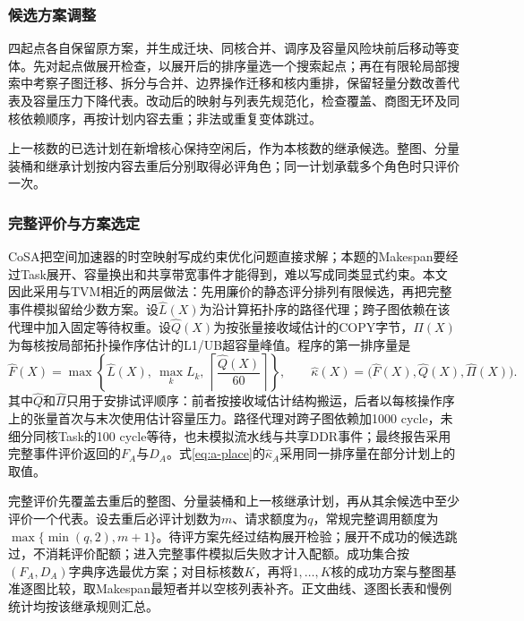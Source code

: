 \subsubsection{候选方案调整}
四起点各自保留原方案，并生成迁块、同核合并、调序及容量风险块前后移动等变体。先对起点做展开检查，以展开后的排序量选一个搜索起点；再在有限轮局部搜索中考察子图迁移、拆分与合并、边界操作迁移和核内重排，保留轻量分数改善代表及容量压力下降代表。改动后的映射与列表先规范化，检查覆盖、商图无环及同核依赖顺序，再按计划内容去重；非法或重复变体跳过。

上一核数的已选计划在新增核心保持空闲后，作为本核数的继承候选。整图、分量装桶和继承计划按内容去重后分别取得必评角色；同一计划承载多个角色时只评价一次。

\subsubsection{完整评价与方案选定}
CoSA把空间加速器的时空映射写成约束优化问题直接求解\cite{huang2021cosa}；本题的Makespan要经过Task展开、容量换出和共享带宽事件才能得到，难以写成同类显式约束。本文因此采用与TVM相近的两层做法\cite{chen2018tvm}：先用廉价的静态评分排列有限候选，再把完整事件模拟留给少数方案。设$\widehat L(X)$为沿计算拓扑序的路径代理；跨子图依赖在该代理中加入固定等待权重。设$\widehat Q(X)$为按张量接收域估计的COPY字节，$\widehat\Pi(X)$为每核按局部拓扑操作序估计的L1/UB超容量峰值。程序的第一排序量是
\begin{equation}
\widehat F(X)=\max\left\{\widehat L(X),\ \max_k L_k,\
\left\lceil\frac{\widehat Q(X)}{60}\right\rceil\right\},\qquad
\widehat\kappa(X)=\bigl(\widehat F(X),\widehat Q(X),\widehat\Pi(X)\bigr).
\label{eq:a-light-score}
\end{equation}
其中$\widehat Q$和$\widehat\Pi$只用于安排试评顺序：前者按接收域估计结构搬运，后者以每核操作序上的张量首次与末次使用估计容量压力。路径代理对跨子图依赖加1000 cycle，未细分同核Task的100 cycle等待，也未模拟流水线与共享DDR事件；最终报告采用完整事件评价返回的$F_A$与$D_A$。式\eqref{eq:a-place}的$\widehat\kappa_A$采用同一排序量在部分计划上的取值。

完整评价先覆盖去重后的整图、分量装桶和上一核继承计划，再从其余候选中至少评价一个代表。设去重后必评计划数为$m$、请求额度为$q$，常规完整调用额度为$\max\{\min(q,2),m+1\}$。待评方案先经过结构展开检验；展开不成功的候选跳过，不消耗评价配额；进入完整事件模拟后失败才计入配额。成功集合按$(F_A,D_A)$字典序选最优方案；对目标核数$K$，再将$1,\ldots,K$核的成功方案与整图基准逐图比较，取Makespan最短者并以空核列表补齐。正文曲线、逐图长表和慢例统计均按该继承规则汇总。

